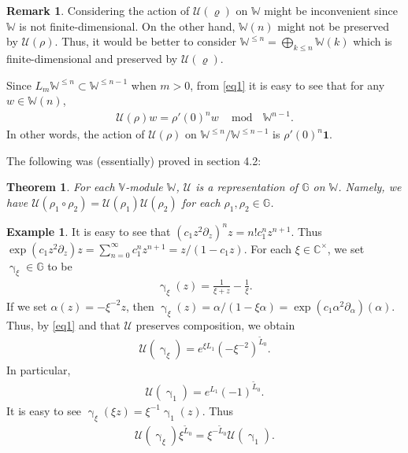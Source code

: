 \documentclass[12pt,a4paper,notitlepage]{article}
\theoremstyle{definition}
\newtheorem{eg}[df]{Example}
\newtheorem{rem}[df]{Remark}
\theoremstyle{plain}
\newtheorem{thm}[df]{Theorem}
\newcommand{\mc}{\mathcal}
\newcommand{\wtd}{\widetilde}
\newcommand{\id}{\mathbf{1}}
\newcommand{\Vbb}{\mathbb V}
\newcommand{\Wbb}{\mathbb W}
\newcommand{\Gbb}{\mathbb G}
\newcommand{\Cbb}{\mathbb C}
\numberwithin{equation}{section}
\begin{document}
\begin{rem}
Considering the action of $\mc U(\varrho)$ on $\Wbb$ might be inconvenient since $\Wbb$ is not finite-dimensional. On the other hand, $\Wbb(n)$ might not be preserved by $\mc U(\rho)$. Thus, it would be better to consider $\Wbb^{\leq n}=\bigoplus_{k\leq n}\Wbb(k)$\index{VW@$\Vbb^{\leq n},\Wbb^{\leq n}$} which is finite-dimensional and preserved by $\mc U(\varrho)$.

Since $L_m\Wbb^{\leq n}\subset\Wbb^{\leq n-1}$ when $m>0$, from \eqref{eq1} it is easy to see that for any $w\in\Wbb(n)$,
\begin{align}
\mc U(\rho)w=\rho'(0)^nw~~\mod~~ \Wbb^{n-1}.\label{eq5}
\end{align}
In other words, the action of $\mc U(\rho)$ on $\Wbb^{\leq n}/\Wbb^{\leq n-1}$ is $\rho'(0)^n\id$.
\end{rem}


The following was (essentially) proved in \cite{Hua97} section 4.2:
\begin{thm}
	For each $\Vbb$-module $\Wbb$, $\mc U$ is a representation of $\Gbb$ on $\Wbb$. Namely, we have $\mc U(\rho_1\circ\rho_2)=\mc U(\rho_1)\mc U(\rho_2)$ for each $\rho_1,\rho_2\in\Gbb$.
\end{thm}


\begin{eg}
It is easy to see that $(c_1z^2\partial_z)^nz=n!c_1^nz^{n+1}$. Thus $\exp(c_1z^2\partial_z)z=\sum_{n=0}^{\infty}c_1^nz^{n+1}=z/(1-c_1z)$. For each $\xi\in\Cbb^\times$, we set $\upgamma_\xi\in\Gbb$  to be
\begin{align}
\upgamma_\xi(z)=\frac 1{\xi+z}-\frac 1\xi.
\end{align}
If we set $\alpha(z)=-\xi^{-2}z$, then $\upgamma_\xi(z)=\alpha/(1-\xi \alpha)=\exp(c_1\alpha^2\partial_\alpha)(\alpha)$. Thus, by \eqref{eq1} and that $\mc U$ preserves composition, we obtain
\begin{align}
\mc U(\upgamma_\xi)=e^{\xi L_1}(-\xi^{-2})^{\wtd L_0}.
\end{align}
In particular,
\begin{align}
\mc U(\upgamma_1)=e^{L_1}(-1)^{\wtd L_0}.
\end{align}
It is easy to see $\upgamma_\xi(\xi z)=\xi^{-1}\upgamma_1(z)$. Thus
\begin{align}
\mc U(\upgamma_\xi)\xi^{\wtd L_0}=\xi^{-\wtd L_0}\mc U(\upgamma_1).\label{eq22}
\end{align}
\end{eg}
\end{document}
